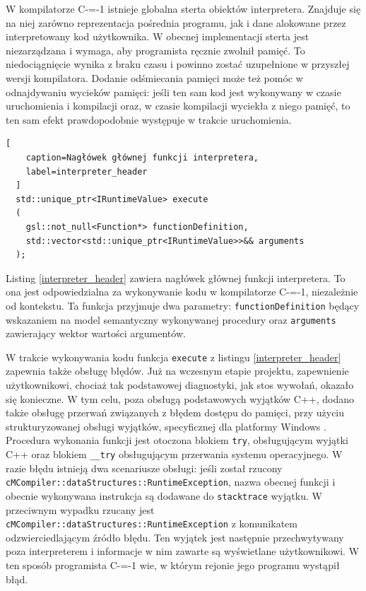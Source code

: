 W kompilatorze C-=-1 istnieje globalna sterta obiektów interpretera.
Znajduje się na niej zarówno reprezentacja pośrednia programu, jak i dane alokowane przez interpretowany kod użytkownika.
W obecnej implementacji sterta jest niezarządzana i wymaga, aby programista ręcznie zwolnił pamięć.
To niedociągnięcie wynika z braku czasu i powinno zostać uzupełnione w przyszłej wersji kompilatora.
Dodanie odśmiecania pamięci może też pomóc w odnajdywaniu wycieków pamięci: jeśli ten sam kod jest wykonywany w czasie uruchomienia i kompilacji oraz, w czasie kompilacji wyciekła z niego pamięć, to ten sam efekt prawdopodobnie występuje w trakcie uruchomienia.
\begin{minipage}{\textwidth}
  
  \begin{lstlisting}[
    caption=Nagłówek głównej funkcji interpretera,
    label=interpreter_header
  ]
  std::unique_ptr<IRuntimeValue> execute
  (
    gsl::not_null<Function*> functionDefinition,
    std::vector<std::unique_ptr<IRuntimeValue>>&& arguments
  );
  \end{lstlisting}
  
\end{minipage}
Listing \ref{interpreter_header} zawiera nagłówek głównej funkcji interpretera.
To ona jest odpowiedzialna za wykonywanie kodu w kompilatorze C-=-1, niezależnie od kontekstu.
Ta funkcja przyjmuje dwa parametry: \lstinline{functionDefinition} będący wskazaniem na model semantyczny wykonywanej procedury oraz \lstinline{arguments} zawierający wektor wartości argumentów.

W trakcie wykonywania kodu funkcja \lstinline{execute} z listingu \ref{interpreter_header} zapewnia także obsługę błędów.
Już na wczesnym etapie projektu, zapewnienie użytkownikowi, chociaż tak podstawowej diagnostyki, jak stos wywołań, okazało się konieczne.
W tym celu, poza obsługą podstawowych wyjątków C++, dodano także obsługę przerwań związanych z błędem dostępu do pamięci, przy użyciu strukturyzowanej obsługi wyjątków, specyficznej dla platformy Windows \cite{structured_exception_handling, structured_exception_handling:microsoft}.
Procedura wykonania funkcji jest otoczona blokiem \lstinline{try}, obsługującym wyjątki C++ oraz blokiem \lstinline{__try} obsługującym przerwania systemu operacyjnego.
W razie błędu istnieją dwa scenariusze obsługi: jeśli został rzucony \\\lstinline{cMCompiler::dataStructures::RuntimeException}, nazwa obecnej funkcji i obecnie wykonywana instrukcja są dodawane do \lstinline{stacktrace} wyjątku.
W przeciwnym wypadku rzucany jest \\\lstinline{cMCompiler::dataStructures::RuntimeException} z komunikatem odzwierciedlającym źródło błędu.
Ten wyjątek jest następnie przechwytywany poza interpreterem i informacje w nim zawarte są wyświetlane użytkownikowi.
W ten sposób programista C-=-1 wie, w którym rejonie jego programu wystąpił błąd.

